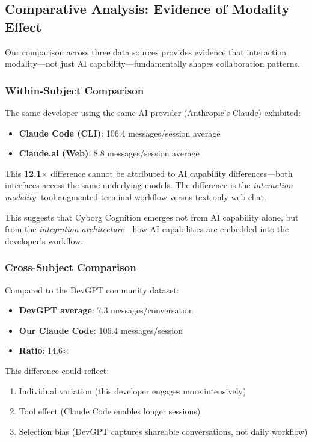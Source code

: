 \documentclass{ntlabs-preprint}
\begin{document}
\subsection{Comparative Analysis: Evidence of Modality Effect}

Our comparison across three data sources provides evidence that interaction modality---not just AI capability---fundamentally shapes collaboration patterns.

\subsubsection{Within-Subject Comparison}

The same developer using the same AI provider (Anthropic's Claude) exhibited:
\begin{itemize}
    \item \textbf{Claude Code (CLI)}: 106.4 messages/session average
    \item \textbf{Claude.ai (Web)}: 8.8 messages/session average
\end{itemize}

This \textbf{12.1$\times$} difference cannot be attributed to AI capability differences---both interfaces access the same underlying models. The difference is the \textit{interaction modality}: tool-augmented terminal workflow versus text-only web chat.

This suggests that Cyborg Cognition emerges not from AI capability alone, but from the \textit{integration architecture}---how AI capabilities are embedded into the developer's workflow.

\subsubsection{Cross-Subject Comparison}

Compared to the DevGPT community dataset:
\begin{itemize}
    \item \textbf{DevGPT average}: 7.3 messages/conversation
    \item \textbf{Our Claude Code}: 106.4 messages/session
    \item \textbf{Ratio}: 14.6$\times$
\end{itemize}

This difference could reflect:
\begin{enumerate}
    \item Individual variation (this developer engages more intensively)
    \item Tool effect (Claude Code enables longer sessions)
    \item Selection bias (DevGPT captures shareable conversations, not daily workflow)
\end{enumerate}
\end{document}
